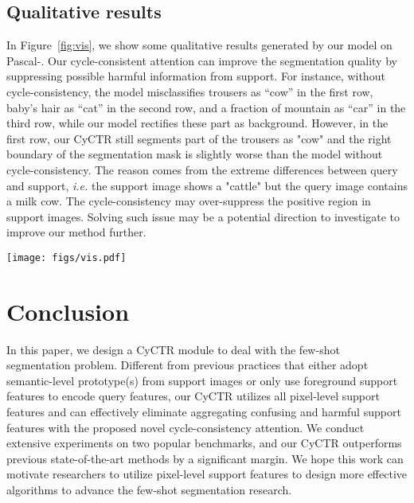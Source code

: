 \documentclass{article}
\begin{document}
\subsection{Qualitative results}
In Figure~\ref{fig:vis}, we show some qualitative results generated by our model on Pascal-. Our cycle-consistent attention can improve the segmentation quality by suppressing possible harmful information from support. For instance, without cycle-consistency, the model misclassifies trousers as “cow” in the first row, baby's hair as “cat” in the second row, and a fraction of mountain as “car” in the third row, while our model rectifies these part as background. However, in the first row, our CyCTR still segments part of the trousers as "cow" and the right boundary of the segmentation mask is slightly worse than the model without cycle-consistency. The reason comes from the extreme differences between query and support, \textit{i.e.} the support image shows a "cattle" but the query image contains a milk cow. The cycle-consistency may over-suppress the positive region in support images. Solving such issue may be a potential direction to investigate to improve our method further. 


	\begin{figure*}[t]
		\centering
		\texttt{[image: figs/vis.pdf]}
		\caption{Qualitative results on Pascal-. From left to right, each column shows the examples of: Support image with mask region in red; Query image with ground truth mask region in blue; Result produced by the model without cycle-consistency in CyCTR; Result produced by our method. }
		\vspace{-4mm}
		\label{fig:vis}
	\end{figure*} 
\section{Conclusion}
In this paper, we design a CyCTR module to deal with the few-shot segmentation problem. Different from previous practices that either adopt semantic-level prototype(s) from support images or only use foreground support features to encode query features, 
our CyCTR utilizes all pixel-level support features and can effectively eliminate aggregating confusing and harmful support features with the proposed novel cycle-consistency attention. We conduct extensive experiments on two popular benchmarks, and our CyCTR outperforms previous state-of-the-art methods by a significant margin. We hope this work can motivate researchers to utilize pixel-level support features to design more effective algorithms to advance the few-shot segmentation research.
\end{document}

